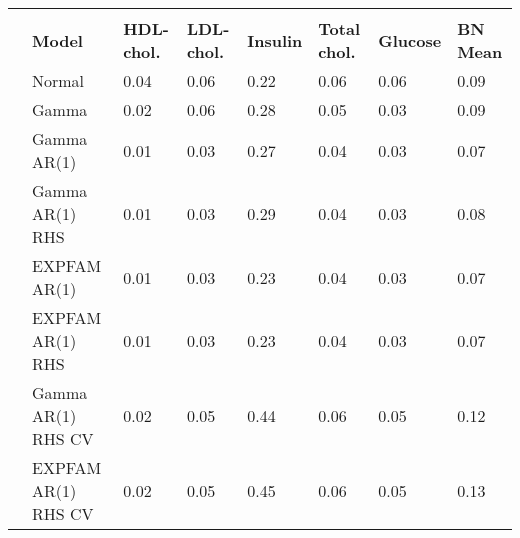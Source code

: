 \documentclass[border=1mm, preview]{standalone}
\begin{document}
\begin{table}[H]
\centering
\begin{tabular}{l>{\raggedright\arraybackslash}p{13em}llllll}
\toprule
\multicolumn{2}{c}{ } & \multicolumn{6}{c}{NRMSE} \\
\cmidrule(l{3pt}r{3pt}){3-8}
\textbf{ } & \textbf{Model} & \textbf{HDL-chol.} & \textbf{LDL-chol.} & \textbf{Insulin} & \textbf{Total chol.} & \textbf{Glucose} & \textbf{BN Mean}\\
\midrule
 & Normal & 0.04 & 0.06 & 0.22 & 0.06 & 0.06 & 0.09\\
 & Gamma & 0.02 & 0.06 & 0.28 & 0.05 & 0.03 & 0.09\\
 & Gamma AR(1) & 0.01 & 0.03 & 0.27 & 0.04 & 0.03 & 0.07\\
 & Gamma AR(1) RHS & 0.01 & 0.03 & 0.29 & 0.04 & 0.03 & 0.08\\
 & EXPFAM AR(1) & 0.01 & 0.03 & 0.23 & 0.04 & 0.03 & 0.07\\
\addlinespace
 & EXPFAM AR(1) RHS & 0.01 & 0.03 & 0.23 & 0.04 & 0.03 & 0.07\\
 & Gamma AR(1) RHS CV & 0.02 & 0.05 & 0.44 & 0.06 & 0.05 & 0.12\\
 & EXPFAM AR(1) RHS CV & 0.02 & 0.05 & 0.45 & 0.06 & 0.05 & 0.13\\
\bottomrule
\end{tabular}
\end{table}
\end{document}
